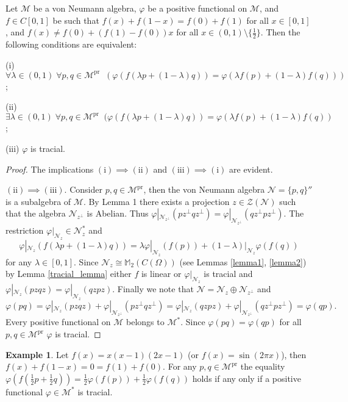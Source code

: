 \documentclass[
11pt,%
tightenlines,%
twoside,%
onecolumn,%
nofloats,%
nobibnotes,%
nofootinbib,%
superscriptaddress,%
noshowpacs,%
centertags]%
{revtex4}
\theoremstyle{definition}
\newtheorem{example}{Example} %
\begin{document}
\begin{theorem}
Let $\mathcal{M}$ be a von Neumann algebra,
 $\varphi $ be  a positive  functional on $ \mathcal{M}$, and  $f\in C[0,1]$ be such that $f(x)+f(1-x)=f(0)+f(1)$ for all $ x\in[0,1]$,
and $f(x)\neq f(0)+(f(1)-f(0))x$ for all $x\in (0,1)\setminus\{\frac{1}{2}\}$.
Then the following conditions are equivalent:

{\rm (i)} $\forall \lambda\in (0,1) \; \forall p, q\in \mathcal{M}^\mathrm{pr} \; \;
(\varphi(f(\lambda p+(1-\lambda)q))=\varphi(\lambda f(p)+(1-\lambda)f(q)))$;

{\rm (ii)} $\exists \lambda\in (0,1) \; \forall p, q\in \mathcal{M}^\mathrm{pr}\; \;
(\varphi (f(\lambda p+(1-\lambda)q))=\varphi (\lambda f(p)+(1-\lambda)f(q))$;

{\rm (iii)} $\varphi$ is tracial.
\end{theorem}
\begin{proof}
The implications $\mathrm{(i)} \implies \mathrm{(ii)}$ and   $\mathrm{(iii)} \implies \mathrm{(i)}$  are evident.

$\mathrm{(ii)}\implies \mathrm{(iii)}$. Consider $p, q\in
\mathcal{M}^\mathrm{pr}$, then the von  Neumann algebra
$\mathcal{N}=\{p, q\}''$ is a subalgebra of $\mathcal{M}$. By Lemma
1 there exists a projection $z\in\mathcal{Z}(\mathcal{N}) $ such
that the algebra $\mathcal{N}_{z^\perp}$ is Abelian.
 Thus $\varphi|_{\mathcal{N}_{z^\perp}}(pz^\perp qz^\perp)=
\varphi|_{\mathcal{N}_{z^\perp}}(qz^\perp pz^\perp)$.
The restriction $\varphi|_{\mathcal{N}_z}\in \mathcal{N}_z^*$
and
$$
\varphi|_{\mathcal{N}_z}(f(\lambda p+(1-\lambda) q))=\lambda \varphi|_{\mathcal{N}_z}
(f(p))+(1-\lambda)|_{\mathcal{N}_z}\varphi(f(q))
$$
for any $\lambda\in[0,1]$. Since $\mathcal{N}_z \cong
\mathbb{M}_2(C(\Omega))$  (see Lemmas \ref{lemma1}, \ref{lemma2}) by
Lemma \ref{tracial_lemma} either $f$ is linear or
$\varphi|_{\mathcal{N}_z}$ is tracial and
$\varphi|_{\mathcal{N}_z}(pzqz)=\varphi|_{\mathcal{N}_z}(qzpz)$.
Finally we note that $\mathcal{N}=\mathcal{N}_{z}\oplus
\mathcal{N}_{z^\perp}$ and
$$
\varphi(pq)=\varphi|_{\mathcal{N}_z}(pzqz)+\varphi|_{\mathcal{N}_{z^\perp}}(pz^\perp qz^\perp)=
\varphi|_{\mathcal{N}_z}(qzpz)+\varphi|_{\mathcal{N}_{z^\perp}}(qz^\perp pz^\perp)=\varphi(qp).
$$
Every  positive  functional on $ \mathcal{M}$ belongs to $ \mathcal{M}^*$.
Since  $\varphi(pq)=\varphi(qp)$ for all $p, q\in \mathcal{M}^\mathrm{pr}$ $\varphi$ is tracial.
\end{proof}

\begin{example}
 Let $f(x)=x(x-1)(2x-1)$ (or  $f(x)=\sin(2\pi x)$),
 then $f(x)+f(1-x)=0=f(1)+f(0)$. For any $p, q\in \mathcal{M}^\mathrm{pr}$
 the equality $\varphi(f(\frac{1}{2} p+\frac{1}{2}q))=\frac{1}{2} \varphi(f(p))+\frac{1}{2}\varphi(f(q))$
  holds if any only if a positive functional $\varphi\in \mathcal{M}^*$
 is tracial.
\end{example}
\end{document}
